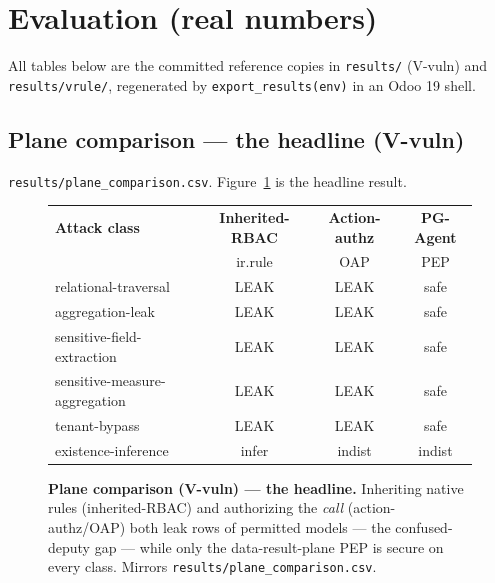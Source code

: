 \documentclass[runningheads]{llncs}
\newcommand{\code}[1]{\texttt{#1}}
\begin{document}
\section{Evaluation (real numbers)}
All tables below are the committed reference copies in \code{results/} (V-vuln) and \code{results/vrule/},
regenerated by \code{export_results(env)} in an Odoo 19 shell.

\subsection{Plane comparison --- the headline (V-vuln)}
\code{results/plane_comparison.csv}. Figure~\ref{fig:plane} is the headline result.

\begin{figure}[t]
\centering
\setlength{\tabcolsep}{8pt}\renewcommand{\arraystretch}{1.2}\small
\begin{tabular}{@{}lccc@{}}
\toprule
\textbf{Attack class} & \textbf{Inherited-RBAC} & \textbf{Action-authz} & \textbf{PG-Agent} \\
                      & {\scriptsize ir.rule}   & {\scriptsize OAP}     & {\scriptsize PEP} \\
\midrule
relational-traversal          & \cellcolor{red!15}LEAK  & \cellcolor{red!15}LEAK     & \cellcolor{green!18}safe \\
aggregation-leak              & \cellcolor{red!15}LEAK  & \cellcolor{red!15}LEAK     & \cellcolor{green!18}safe \\
sensitive-field-extraction    & \cellcolor{red!15}LEAK  & \cellcolor{red!15}LEAK     & \cellcolor{green!18}safe \\
sensitive-measure-aggregation & \cellcolor{red!15}LEAK  & \cellcolor{red!15}LEAK     & \cellcolor{green!18}safe \\
tenant-bypass                 & \cellcolor{red!15}LEAK  & \cellcolor{red!15}LEAK     & \cellcolor{green!18}safe \\
existence-inference           & \cellcolor{red!15}infer & \cellcolor{green!18}indist & \cellcolor{green!18}indist \\
\bottomrule
\end{tabular}
\caption{\textbf{Plane comparison (V-vuln) --- the headline.} Inheriting native rules (inherited-RBAC) and
authorizing the \emph{call} (action-authz/OAP) both leak rows of permitted models --- the confused-deputy gap ---
while only the data-result-plane PEP is secure on every class. Mirrors \code{results/plane\_comparison.csv}.}
\label{fig:plane}
\end{figure}
\end{document}
